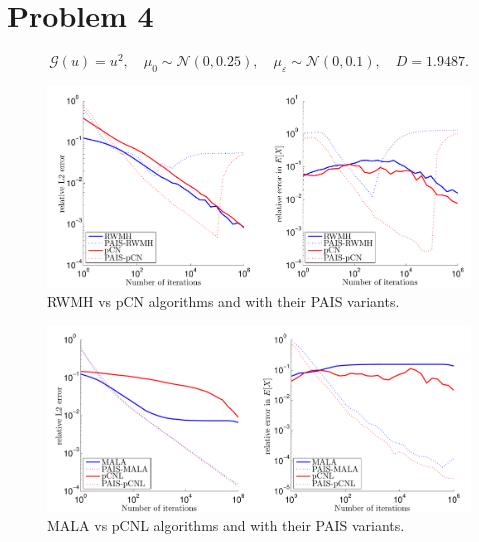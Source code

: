 \documentclass{article}
\begin{document}
\section{Problem 4}
\[
	\mathcal{G}(u) = u^2, \quad \mu_0 \sim \mathcal{N}(0, 0.25), \quad \mu_\varepsilon \sim \mathcal{N}(0, 0.1), \quad D = 1.9487.
\]
\begin{figure}[h]
\begin{center}
\includegraphics[width=\textwidth]{figures/RWMH4-pCN4}
\end{center}
\caption{RWMH vs pCN algorithms and with their PAIS variants.}
\label{fig:RWMH1}
\end{figure}
\begin{figure}[h]
\begin{center}
\includegraphics[width=\textwidth]{figures/MALA4-pCNL4}
\end{center}
\caption{MALA vs pCNL algorithms and with their PAIS variants.}
\label{fig:MALA1}
\end{figure}
\end{document}
